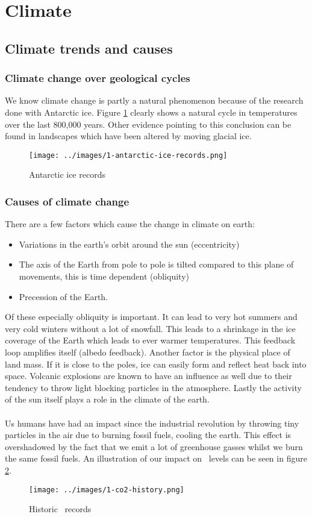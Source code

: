 \documentclass[../summary.tex]{subfiles}
\begin{document}
\section{Climate}
\subsection{Climate trends and causes}
\subsubsection{Climate change over geological cycles}
We know climate change is partly a natural phenomenon because of the research done with Antarctic ice. Figure \ref{fig:antarctic-ice-records} clearly shows a natural cycle in temperatures over the last 800,000 years. Other evidence pointing to this conclusion can be found in landscapes which have been altered by moving glacial ice.
\begin{figure}[h]
	\centering
	\texttt{[image: ../images/1-antarctic-ice-records.png]}
	\caption{Antarctic ice records}
	\label{fig:antarctic-ice-records}
\end{figure}

\subsubsection{Causes of climate change}
There are a few factors which cause the change in climate on earth:
\begin{itemize}
	\item Variations in the earth's orbit around the sun (eccentricity)
	\item The axis of the Earth from pole to pole is tilted compared to this plane of movements, this is time dependent (obliquity)
	\item Precession of the Earth.
\end{itemize}
Of these especially obliquity is important. It can lead to very hot summers and very cold winters without a lot of snowfall. This leads to a shrinkage in the ice coverage of the Earth which leads to ever warmer temperatures. This feedback loop amplifies itself (albedo feedback). Another factor is the physical place of land mass. If it is close to the poles, ice can easily form and reflect heat back into space. Volcanic explosions are known to have an influence as well due to their tendency to throw light blocking particles in the atmosphere. Lastly the activity of the sun itself plays a role in the climate of the earth.
\\\\
Us humans have had an impact since the industrial revolution by throwing tiny particles in the air due to burning fossil fuels, cooling the earth. This effect is overshadowed by the fact that we emit a lot of greenhouse gasses whilst we burn the same fossil fuels. An illustration of our impact on \COtwo\ levels can be seen in figure \ref{fig:co2-history}.
\begin{figure}[h]
	\centering
	\texttt{[image: ../images/1-co2-history.png]}
	\caption{Historic \COtwo\ records}
	\label{fig:co2-history}
\end{figure}
\end{document}
